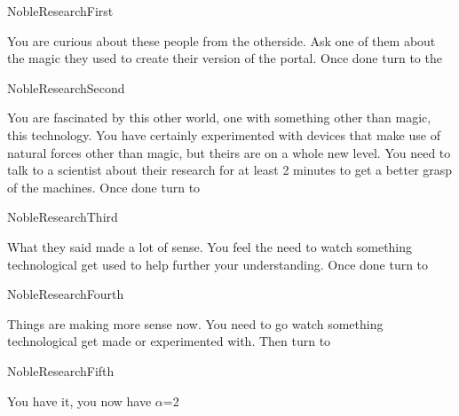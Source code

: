 \documentclass[greennotebook]{guildcamp3} %
\begin{document}
	
	\startnotebook{\nNobleOneResearch{}}
	
	\begin{page}{NobleResearchFirst}
		
		You are curious about these people from the otherside. Ask one of them about the magic they used to create their version of the portal.  Once done turn to the 
		
	\end{page}
	
	\begin{page}{NobleResearchSecond}
		
		You are fascinated by this other world, one with something other than magic, this technology. You have certainly experimented with devices that make use of natural forces other than magic, but theirs are on a whole new level. You need to talk to a scientist about their research for at least 2 minutes to get a better grasp of the machines. Once done turn to 
		
		
	\end{page}
	
	\begin{page}{NobleResearchThird}
		
		What they said made a lot of sense. You feel the need to watch something technological get used to help further your understanding. Once done turn to 
		
	\end{page}
	
	\begin{page}{NobleResearchFourth}
		
		Things are making more sense now. You need to go watch something technological get made or experimented with. Then turn to 
		
	\end{page}
	
	
	\begin{page}{NobleResearchFifth}
		
		You have it, you now have {$\alpha$}={2}
		
	\end{page}
	
	\endnotebook
	
\end{document}
